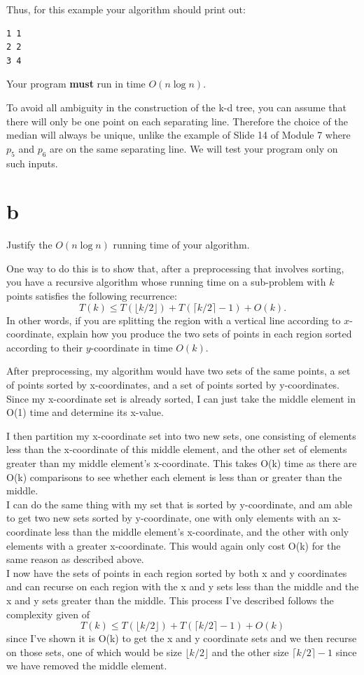 \documentclass[12pt]{article}
\begin{document}
\begin{enumerate}
Thus, for this example your algorithm should print out:
\begin{verbatim}
1 1
2 2
3 4 
\end{verbatim}
Your program {\bf must} run in time $O(n \log n)$.

To avoid all ambiguity in the construction of the k-d tree, you can assume that 
there will only be one point on each separating line. 
Therefore the choice of the median will always be unique, 
unlike the example of Slide 14 of Module 7 where $p_5$ and $p_6$ are on the same separating line. 
We will test your program only on such inputs.

\part{b} Justify the $O(n \log n)$ running time of your algorithm.  

One way to do this is to show that, after a preprocessing that involves sorting, 
you have a recursive algorithm whose running time on a sub-problem with $k$ points
satisfies the following recurrence: 
$$T(k) \leq T(\lfloor k/2\rfloor) + T(\lceil k/2 \rceil-1)+ O(k).$$
In other words, if you are splitting the region with a
vertical line according to $x$-coordinate, 
explain how you produce the two sets of points in each
region sorted according to their $y$-coordinate in time $O(k)$.

After preprocessing, my algorithm would have two sets of the same points, a set of points sorted by x-coordinates, and a set of points sorted by y-coordinates. Since my x-coordinate set is already sorted, I can just take the middle element in O(1) time and determine its x-value.

I then partition my x-coordinate set into two new sets, one consisting of elements less than the x-coordinate of this middle element, and the other set of elements greater than my middle element's x-coordinate. This takes O(k) time as there are O(k) comparisons to see whether each element is less than or greater than the middle.\\

I can do the same thing with my set that is sorted by y-coordinate, and am able to get two new sets sorted by y-coordinate, one with only elements with an x-coordinate less than the middle element's x-coordinate, and the other with only elements with a greater x-coordinate. This would again only cost O(k) for the same reason as described above.\\

I now have the sets of points in each region sorted by both x and y coordinates and can recurse on each region with the x and y sets less than the middle and the x and y sets greater than the middle. This process I've described follows the complexity given of $$T(k) \leq T(\lfloor k/2\rfloor) + T(\lceil k/2 \rceil-1)+ O(k)$$ since I've shown it is O(k) to get the x and y coordinate sets and we then recurse on those sets, one of which would be size $\lfloor k/2 \rfloor$ and the other size $\lceil k/2 \rceil -1$ since we have removed the middle element.

\end{enumerate}
\end{document}
